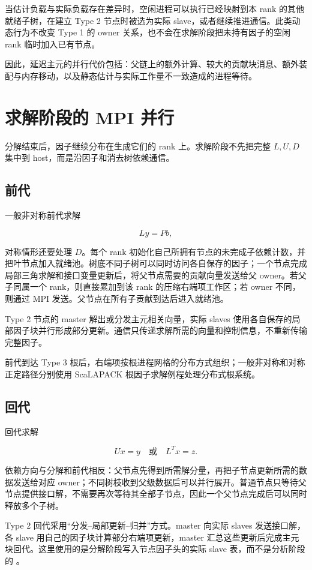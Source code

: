 当估计负载与实际负载存在差异时，空闲进程可以执行已经映射到本 rank 的其他就绪子树，在建立 Type 2 节点时被选为实际 slave，或者继续推进通信。此类动态行为不改变 Type 1 的 owner 关系，也不会在求解阶段把未持有因子的空闲 rank 临时加入已有节点。

因此，延迟主元的并行代价包括：父链上的额外计算、较大的贡献块消息、额外装配与内存移动，以及静态估计与实际工作量不一致造成的进程等待。

\section{求解阶段的 MPI 并行}

分解结束后，因子继续分布在生成它们的 rank 上。求解阶段不先把完整 $L,U,D$ 集中到 host，而是沿因子和消去树依赖通信。

\subsection{前代}

一般非对称前代求解

\[
Ly=Pb,
\]

对称情形还要处理 $D$。每个 rank 初始化自己所拥有节点的未完成子依赖计数，并把叶节点加入就绪池。树底不同子树可以同时访问各自保存的因子；一个节点完成局部三角求解和接口变量更新后，将父节点需要的贡献向量发送给父 owner。若父子同属一个 rank，则直接累加到该 rank 的压缩右端项工作区；若 owner 不同，则通过 MPI 发送。父节点在所有子贡献到达后进入就绪池。

Type 2 节点的 master 解出或分发主元相关向量，实际 slaves 使用各自保存的局部因子块并行形成部分更新。通信只传递求解所需的向量和控制信息，不重新传输完整因子。

前代到达 Type 3 根后，右端项按根进程网格的分布方式组织；一般非对称和对称正定路径分别使用 ScaLAPACK 根因子求解例程处理分布式根系统。

\subsection{回代}

回代求解

\[
Ux=y
\quad\text{或}\quad
L^Tx=z.
\]

依赖方向与分解和前代相反：父节点先得到所需解分量，再把子节点更新所需的数据发送给对应 owner；不同树枝收到父级数据后可以并行展开。普通节点只等待父节点提供接口解，不需要再次等待其全部子节点，因此一个父节点完成后可以同时释放多个子树。

Type 2 回代采用“分发--局部更新--归并”方式。master 向实际 slaves 发送接口解，各 slave 用自己的因子块计算部分右端项更新，master 汇总这些更新后完成主元块回代。这里使用的是分解阶段写入节点因子头的实际 slave 表，而不是分析阶段的 。

